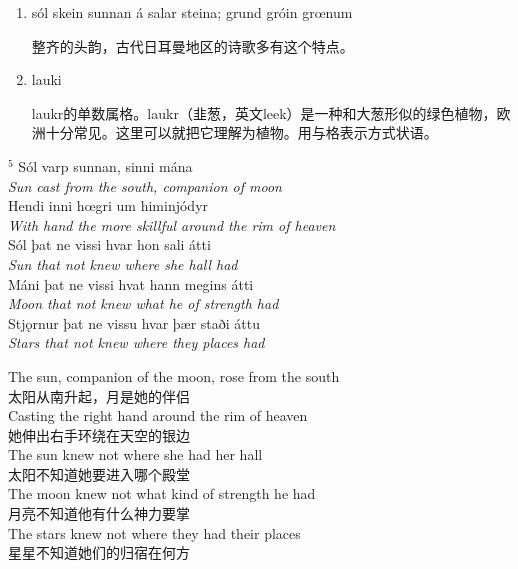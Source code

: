 \begin{grammar*}{}
    \begin{enumerate}[leftmargin=*]
        \item sól skein sunnan á salar steina; grund gróin grœnum

              整齐的头韵，古代日耳曼地区的诗歌多有这个特点。

        \item lauki

              laukr的单数属格。laukr（韭葱，英文leek）是一种和大葱形似的绿色植物，欧洲十分常见。这里可以就把它理解为植物。用与格表示方式状语。
    \end{enumerate}
\end{grammar*}
\medskip %

\begin{paracol}{2}
    \noindent
    $^5 $ Sól varp sunnan, sinni mána\\
    \textit{Sun cast from the south, companion of moon}\\
    Hendi inni hœgri um himinjódyr\\
    \textit{With hand the more skillful around the rim of heaven}\\
    Sól þat ne vissi hvar hon sali átti\\
    \textit{Sun that not knew where she hall had}\\
    Máni þat ne vissi hvat hann megins átti\\
    \textit{Moon that not knew what he of strength had}\\
    Stjǫrnur þat ne vissu hvar þær staði áttu\\
    \textit{Stars that not knew where they places had}\\

    \switchcolumn

    \noindent
    The sun, companion of the moon, rose from the south\\
    太阳从南升起，月是她的伴侣\\
    Casting the right hand around the rim of heaven  \\
    她伸出右手环绕在天空的银边\\
    The sun knew not where she had her hall\\
    太阳不知道她要进入哪个殿堂\\
    The moon knew not what kind of strength he had\\
    月亮不知道他有什么神力要掌\\
    The stars knew not where they had their places\\
    星星不知道她们的归宿在何方\\

\end{paracol}
